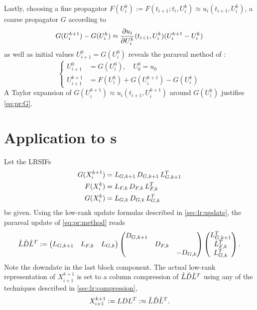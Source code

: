 Lastly, choosing a fine propagator $F(U^k_i) := F(t_{i+1}; t_i, U^k_i) \approx u_i(t_{i+1}, U^k_i)$,
a coarse propagator $G$ according to
\begin{equation}
  \label{eq:pr:G}
  G(U^{k+1}_i) - G(U^k_i)
  \approx
  \pdiff{U^k_i}{u_i}(t_{i+1}, U^k_i) (U^{k+1}_i - U^k_i)
\end{equation}
as well as initial values $ U^0_{i+1} = G(U^0_i) $
reveals the parareal method of \cite{Baffico2002}:
\begin{equation}
  \left\{
  \begin{aligned}
    U^0_{i+1} &= G(U^0_i),
    \quad
    U^0_0 = u_0 \\
    U^{k+1}_{i+1} &= F(U^k_i) + G(U^{k+1}_i) - G(U^k_i)
  \end{aligned}
  \right.
\end{equation}
A Taylor expansion of $G(U^{k+1}_i) \approx u_i(t_{i+1}, U^{k+1}_i)$ around $G(U^k_i)$ justifies \eqref{eq:pr:G}.

\section{Application to s}
\label{sec:pr:DRE}


Let the \acp{LRSIF}
\begin{equation}
\begin{aligned}
  G(X^{k+1}_i) &= \mathop{L_{G,k+1}} \mathop{D_{G,k+1}} \mathop{L_{G,k+1}^T} \\
  F(X^k_i)     &= \mathop{L_{F,k}}   \mathop{D_{F,k}}   \mathop{L_{F,k}^T} \\
  G(X^k_i)     &= \mathop{L_{G,k}}   \mathop{D_{G,k}}   \mathop{L_{G,k}^T}
\end{aligned}
\end{equation}
be given.
Using the low-rank update formulas described in \autoref{sec:lr:update},
the parareal update of \eqref{eq:pr:method} reads
\begin{equation}
  \hat L \hat D \hat L^T :=
  \begin{pmatrix}
    L_{G,k+1} &
    L_{F,k} &
    L_{G,k}
  \end{pmatrix}
  \begin{pmatrix}
    D_{G,k+1} \\
    & D_{F,k} \\
    && -D_{G,k}
  \end{pmatrix}
  \begin{pmatrix}
    L_{G,k+1}^T \\
    L_{F,k}^T \\
    L_{G,k}^T
  \end{pmatrix}
  .
\end{equation}
Note the downdate in the last block component.
The actual low-rank representation of $X^{k+1}_{i+1}$ is set to a column compression of $\hat L \hat D \hat L^T$
using any of the techniques described in \autoref{sec:lr:compression},
\begin{equation}
  X^{k+1}_{i+1}
  := LDL^T
  :\approx \hat L \hat D \hat L^T
  .
\end{equation}

